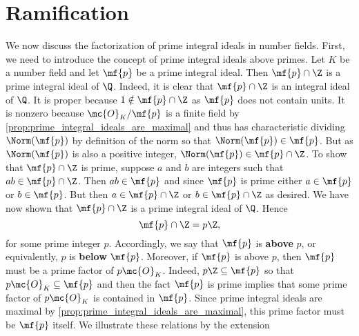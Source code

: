   \section{Ramification}
    We now discuss the factorization of prime integral ideals in number fields. First, we need to introduce the concept of prime integral ideals above primes. Let $K$ be a number field and let $\mf{p}$ be a prime integral ideal. Then $\mf{p} \cap \Z$ is a prime integral ideal of $\Q$. Indeed, it is clear that $\mf{p} \cap \Z$ is an integral ideal of $\Q$. It is proper because $1 \notin \mf{p} \cap \Z$ as $\mf{p}$ does not contain units. It is nonzero because $\mc{O}_{K}/\mf{p}$ is a finite field by \cref{prop:prime_integral_ideals_are_maximal} and thus has characteristic dividing $\Norm(\mf{p})$ by definition of the norm so that $\Norm(\mf{p}) \in \mf{p}$. But as $\Norm(\mf{p})$ is also a positive integer, $\Norm(\mf{p}) \in \mf{p} \cap \Z$. To show that $\mf{p} \cap \Z$ is prime, suppose $a$ and $b$ are integers such that $ab \in \mf{p} \cap \Z$. Then $ab \in \mf{p}$ and since $\mf{p}$ is prime either $a \in \mf{p}$ or $b \in \mf{p}$. But then $a \in \mf{p} \cap \Z$ or $b \in \mf{p} \cap \Z$ as desired. We have now shown that $\mf{p} \cap \Z$ is a prime integral ideal of $\Q$. Hence
    \[
      \mf{p} \cap \Z = p\Z,
    \]
    for some prime integer $p$. Accordingly, we say that $\mf{p}$ is \textbf{above} $p$, or equivalently, $p$ is \textbf{below} $\mf{p}$. Moreover, if $\mf{p}$ is above $p$, then $\mf{p}$ must be a prime factor of $p\mc{O}_{K}$. Indeed, $p\Z \subseteq \mf{p}$ so that $p\mc{O}_{K} \subseteq \mf{p}$ and then the fact $\mf{p}$ is prime implies that some prime factor of $p\mc{O}_{K}$ is contained in $\mf{p}$. Since prime integral ideals are maximal by \cref{prop:prime_integral_ideals_are_maximal}, this prime factor must be $\mf{p}$ itself. We illustrate these relations by the extension

    \begin{center}
    \end{center}

